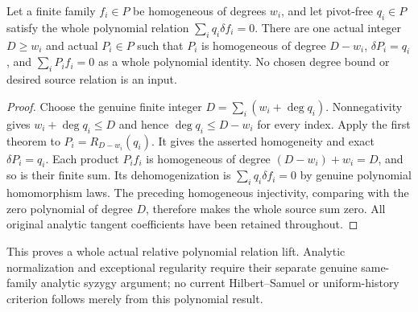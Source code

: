 \begin{theorem}
\label{hir:actual-relative-finite-polynomial-relation-rehomogenization}
\leanok
Let a finite family $f_i\in P$ be homogeneous of degrees $w_i$, and
let pivot-free $q_i\in P$ satisfy the whole polynomial relation
$\sum_iq_i\delta f_i=0$. There are one actual integer $D\ge w_i$
and actual $P_i\in P$ such that $P_i$ is homogeneous of degree
$D-w_i$, $\delta P_i=q_i$, and $\sum_iP_if_i=0$ as a whole
polynomial identity. No chosen degree bound or desired source relation
is an input.
\end{theorem}
\begin{proof}
Choose the genuine finite integer $D=\sum_i(w_i+\deg q_i)$.
Nonnegativity gives $w_i+\deg q_i\le D$ and hence
$\deg q_i\le D-w_i$ for every index. Apply the first theorem to
$P_i=R_{D-w_i}(q_i)$. It gives the asserted homogeneity and exact
$\delta P_i=q_i$. Each product $P_if_i$ is homogeneous of degree
$(D-w_i)+w_i=D$, and so is their finite sum. Its dehomogenization is
$\sum_iq_i\delta f_i=0$ by genuine polynomial homomorphism laws.
The preceding homogeneous injectivity, comparing with the zero
polynomial of degree $D$, therefore makes the whole source sum zero.
All original analytic tangent coefficients have been retained throughout.
\end{proof}

This proves a whole actual relative polynomial relation lift. Analytic
normalization and exceptional regularity require their separate genuine
same-family analytic syzygy argument; no current Hilbert--Samuel or
uniform-history criterion follows merely from this polynomial result.
